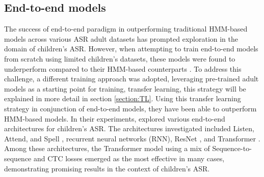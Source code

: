 \subsection{End-to-end models}
The success of end-to-end paradigm in outperforming traditional HMM-based models across various ASR adult datasets has prompted exploration in the domain of children's ASR. However, when attempting to train end-to-end models from scratch using limited children's datasets, these models were found to underperform compared to their HMM-based counterparts \cite{gelin2021endtoend}. To address this challenge, a different training approach was adopted, leveraging pre-trained adult models as a starting point for training, transfer learning, this strategy will be explained in more detail in section \ref{section:TL}. Using this transfer learning strategy in conjunction of end-to-end models, they have been able to outperform HMM-based models. In their experiments, \cite{gelin2021endtoend,sri_end2end,chen2020data,ng2020cuhk} explored various end-to-end architectures for children's ASR. The architectures investigated included Listen, Attend, and Spell \cite{chan2015listen}, recurrent neural networks (RNN), ResNet \cite{targ2016resnet}, and Transformer \cite{Transformer}. Among these architectures, the Transformer model using a mix of Sequence-to-sequence and CTC losses emerged as the most effective in many cases, demonstrating promising results in the context of children's ASR.


